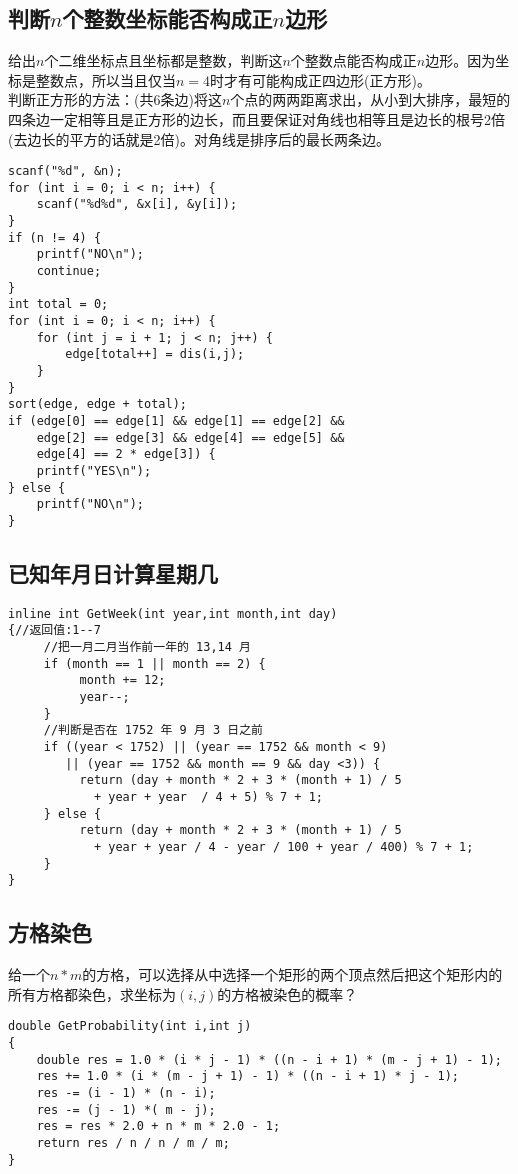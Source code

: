 \subsection{判断$n$个整数坐标能否构成正$n$边形}
给出$n$个二维坐标点且坐标都是整数，判断这$n$个整数点能否构成正$n$边形。因为坐标是整数点，所以当且仅当$n=4$时才有可能构成正四边形(正方形)。\\
判断正方形的方法：(共6条边)将这$n$个点的两两距离求出，从小到大排序，最短的四条边一定相等且是正方形的边长，而且要保证对角线也相等且是边长的根号2倍(去边长的平方的话就是2倍)。对角线是排序后的最长两条边。
\begin{lstlisting}
scanf("%d", &n);
for (int i = 0; i < n; i++) {
    scanf("%d%d", &x[i], &y[i]);
}
if (n != 4) {
    printf("NO\n");
    continue;
}
int total = 0;
for (int i = 0; i < n; i++) {
    for (int j = i + 1; j < n; j++) {
        edge[total++] = dis(i,j);
    }
}
sort(edge, edge + total);
if (edge[0] == edge[1] && edge[1] == edge[2] &&
    edge[2] == edge[3] && edge[4] == edge[5] &&
    edge[4] == 2 * edge[3]) {
    printf("YES\n");
} else {
    printf("NO\n");
}
\end{lstlisting}

\subsection{已知年月日计算星期几}
\begin{lstlisting}
inline int GetWeek(int year,int month,int day)
{//返回值:1--7
     //把一月二月当作前一年的 13,14 月
     if (month == 1 || month == 2) {
          month += 12;
          year--;
     }
     //判断是否在 1752 年 9 月 3 日之前
     if ((year < 1752) || (year == 1752 && month < 9)
        || (year == 1752 && month == 9 && day <3)) {
          return (day + month * 2 + 3 * (month + 1) / 5
            + year + year  / 4 + 5) % 7 + 1;
     } else {
          return (day + month * 2 + 3 * (month + 1) / 5
            + year + year / 4 - year / 100 + year / 400) % 7 + 1;
     }
}
\end{lstlisting}

\subsection{方格染色}
给一个$n*m$的方格，可以选择从中选择一个矩形的两个顶点然后把这个矩形内的所有方格都染色，求坐标为$(i,j)$的方格被染色的概率？
\begin{lstlisting}
double GetProbability(int i,int j)
{
	double res = 1.0 * (i * j - 1) * ((n - i + 1) * (m - j + 1) - 1);
	res += 1.0 * (i * (m - j + 1) - 1) * ((n - i + 1) * j - 1);
	res -= (i - 1) * (n - i);
	res -= (j - 1) *( m - j);
	res = res * 2.0 + n * m * 2.0 - 1;
	return res / n / n / m / m;
}
\end{lstlisting}


